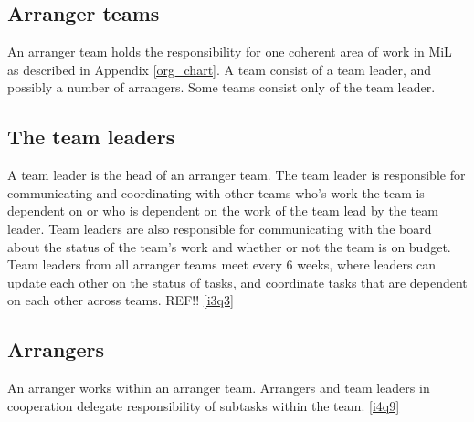 \subsection{Arranger teams} %
\label{sub:arranger_team}
An arranger team holds the responsibility for one coherent area of work in MiL as described in Appendix \ref{org_chart}. A team consist of a team leader, and possibly a number of arrangers. Some teams consist only of the team leader.

\subsection{The team leaders}
\label{sub:team_leaders}
A team leader is the head of an arranger team. The team leader is responsible for communicating and coordinating with other teams who's work the team is dependent on or who is dependent on the work of the team lead by the team leader. Team leaders are also responsible for communicating with the board about the status of the team's work and whether or not the team is on budget. Team leaders from all arranger teams meet every 6 weeks, where leaders can update each other on the status of tasks, and coordinate tasks that are dependent on each other across teams. REF!! \ref{i3q3}

\subsection{Arrangers}
\label{sub:team_members}
An arranger works within an arranger team. Arrangers and team leaders in cooperation delegate responsibility of subtasks within the team. \ref{i4q9}

